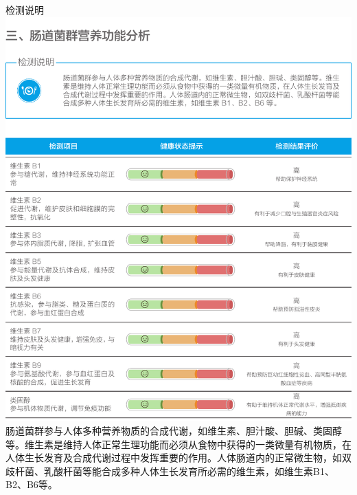 \begin{LRaside}[.8]{检测说明}
\noindent
\includegraphics[width=\linewidth]{yingyanggongneng.pdf}
\asidebreak %
肠道菌群参与人体多种营养物质的合成代谢，如维生素、胆汁酸、胆碱、类固醇等。维生素是维持人体正常生理功能而必须从食物中获得的一类微量有机物质，在人体生长发育及合成代谢过程中发挥重要的作用。人体肠道内的正常微生物，如双歧杆菌、乳酸杆菌等能合成多种人体生长发育所必需的维生素，如维生素B1、B2、B6等。
\end{LRaside}

\vspace*{2mm}
\vspace*{1.5mm}


